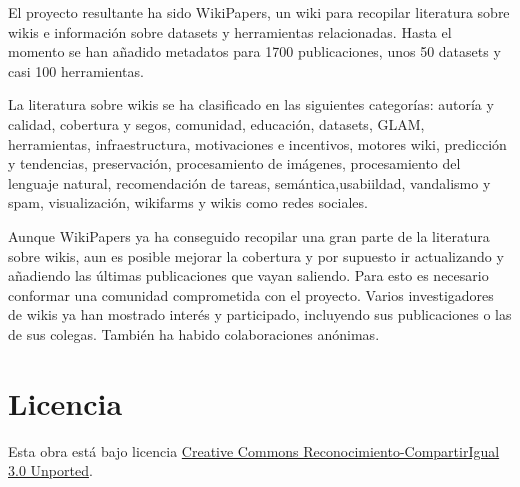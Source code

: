 \documentclass[11pt,onecolumn]{article}
\begin{document}
El proyecto resultante ha sido WikiPapers, un wiki para recopilar literatura sobre wikis e información sobre datasets y herramientas relacionadas. Hasta el momento se han añadido metadatos para 1700 publicaciones, unos 50 datasets y casi 100 herramientas.

La literatura sobre wikis se ha clasificado en las siguientes categorías: autoría y calidad, cobertura y segos, comunidad, educación, datasets, GLAM, herramientas, infraestructura, motivaciones e incentivos, motores wiki, predicción y tendencias, preservación, procesamiento de imágenes, procesamiento del lenguaje natural, recomendación de tareas, semántica,usabiildad, vandalismo y spam, visualización, wikifarms y wikis como redes sociales.

Aunque WikiPapers ya ha conseguido recopilar una gran parte de la literatura sobre wikis, aun es posible mejorar la cobertura y por supuesto ir actualizando y añadiendo las últimas publicaciones que vayan saliendo. Para esto es necesario conformar una comunidad comprometida con el proyecto. Varios investigadores de wikis ya han mostrado interés y participado, incluyendo sus publicaciones o las de sus colegas. También ha habido colaboraciones anónimas.



\clearpage

        


\section*{Licencia}
Esta obra está bajo licencia \href{http://creativecommons.org/licenses/by-sa/3.0/}{Creative Commons Reconocimiento-CompartirIgual 3.0 Unported}.
\end{document}
